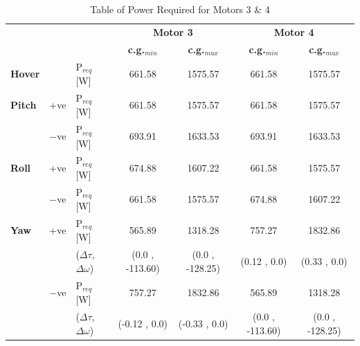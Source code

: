 \begin{table}[H]
\centering
\caption{Table of Power Required for Motors 3 \& 4}
\label{tab:powe_requ_moto_3_4}
\begin{tabular}{lll|cc|cc|}
\cline{4-7}
                           &                            &                                  & \multicolumn{2}{c|}{\textbf{Motor 3}}      & \multicolumn{2}{c|}{\textbf{Motor 4}}      \\ \cline{4-7} 
                           &                            &                                  & \textbf{c.g.$_{min}$}    &\textbf{ c.g.$_{max}$}     & \textbf{c.g.$_{min}$}     & \textbf{c.g.$_{max}$}     \\ \hline
\multicolumn{1}{|l}{\textbf{Hover}} & \multicolumn{1}{l|}{}      & P$_{req}$ {[}W{]}                & 661.58          & 1575.57         & 661.58          & 1575.57         \\ \hline
\multicolumn{1}{|l}{\textbf{Pitch}} & \multicolumn{1}{l|}{+ve}   & P$_{req}$ {[}W{]}                & 661.58          & 1575.57         & 661.58          & 1575.57         \\ \hdashline
\multicolumn{1}{|l}{}      & \multicolumn{1}{l|}{$-$ve} & P$_{req}$ {[}W{]}                & 693.91          & 1633.53         & 693.91          & 1633.53         \\ \hline
\multicolumn{1}{|l}{\textbf{Roll}}  & \multicolumn{1}{l|}{+ve}   & P$_{req}$ {[}W{]}                & 674.88          & 1607.22         & 661.58          & 1575.57         \\ \hdashline
\multicolumn{1}{|l}{}      & \multicolumn{1}{l|}{$-$ve} & P$_{req}$ {[}W{]}                & 661.58          & 1575.57         & 674.88          & 1607.22         \\ \hline
\multicolumn{1}{|l}{\textbf{Yaw}}   & \multicolumn{1}{l|}{+ve}   & P$_{req}$ {[}W{]}                       & 565.89          & 1318.28         & 757.27          & 1832.86         \\ \hdashline
\multicolumn{1}{|l}{}      & \multicolumn{1}{l|}{}      & ($\Delta \tau$, $\Delta \omega$) & (0.0 , -113.60) & (0.0 , -128.25) & (0.12 , 0.0)    & (0.33 , 0.0)    \\ \hdashline
\multicolumn{1}{|l}{}      & \multicolumn{1}{l|}{$-$ve} & P$_{req}$ {[}W{]}                       & 757.27          & 1832.86         & 565.89          & 1318.28         \\ \hdashline
\multicolumn{1}{|l}{}      & \multicolumn{1}{l|}{}      & ($\Delta \tau$, $\Delta \omega$) & (-0.12 , 0.0)   & (-0.33 , 0.0)   & (0.0 , -113.60) & (0.0 , -128.25) \\ \hline
\end{tabular}
\end{table}


